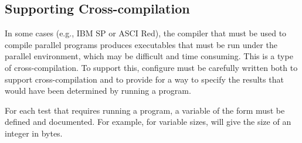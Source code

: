 \documentclass{article}
\begin{document}
\subsection{Supporting Cross-compilation}
In some cases (e.g., IBM SP or ASCI Red), the compiler that must be used to
compile parallel programs produces executables that must be run under
the parallel environment, which may be difficult and time consuming.
This is a type of cross-compilation.  To support this, configure must
be carefully written both to support cross-compilation and to provide
for a way to specify the results that would have been determined by
running a program.

For each test that requires running a program, a variable of the form
 must be defined and documented.  For example, for
variable sizes,  will give the size of an
integer in bytes.
\end{document}
